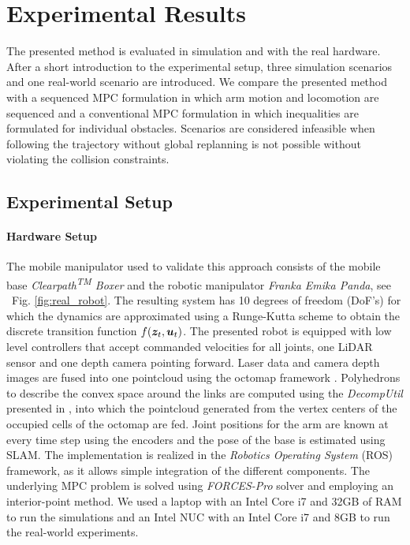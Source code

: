 \section{Experimental Results}
\label{experimental_results}

The presented method is evaluated in simulation and with the real hardware. After a short introduction to the experimental setup, three simulation scenarios and one real-world scenario are introduced. We compare the presented method with a sequenced MPC formulation in which arm motion and locomotion are sequenced and a conventional MPC formulation in which inequalities are formulated for individual obstacles. Scenarios are considered infeasible when following the trajectory without global replanning is not possible without violating the collision constraints.
%
\subsection{Experimental Setup}%
\label{sub:experimental_setup}

\paragraph{Hardware Setup}
The mobile manipulator used to validate this approach consists of the mobile base \textit{Clearpath\textsuperscript{TM} Boxer} and the robotic manipulator \textit{Franka Emika Panda}, see ~{Fig. \ref{fig:real_robot}}. The
resulting system has 10 degrees of freedom (DoF's) for which the dynamics are approximated using a Runge-Kutta scheme to obtain the discrete transition function $f(\bm{z}_t, \bm{u}_t)$.
The presented robot is equipped with low level controllers that accept commanded velocities
for all joints, one LiDAR sensor  and one
depth camera pointing forward. Laser data and camera depth images are fused into one
pointcloud using the octomap framework \cite{Hornung2013}. Polyhedrons to describe the
convex space around the links are computed using the \textit{DecompUtil} presented in
\cite{Liu2017}, into which the pointcloud generated from the vertex centers of the
occupied cells of the octomap are fed.
Joint positions for the arm are known at every time step using the encoders and the pose
of the base is estimated using SLAM.
The implementation is realized in the \textit{Robotics Operating System} (ROS) framework, as it
allows simple integration of the different components. The underlying MPC problem is solved using \textit{FORCES-Pro} solver \cite{FORCESPro} and employing an interior-point method\cite{FORCESNLP}. We used a laptop with an Intel Core i7 and 32GB of RAM to run the simulations and an Intel NUC with an Intel Core i7 and 8GB to run the real-world experiments.

